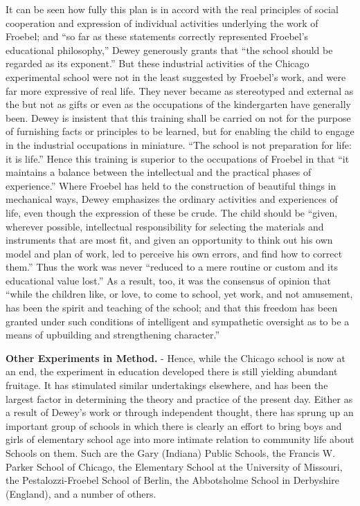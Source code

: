 \documentclass[
]{book}
\begin{document}
It can be seen how fully this plan is in accord with the real principles of social cooperation and expression of individual activities underlying the work of Froebel; and ``so far as these statements correctly represented Froebel's educational philosophy,'' Dewey generously grants that ``the school should be regarded as its exponent.'' But these industrial activities of the Chicago experimental school were not in the least suggested by Froebel's work, and were far more expressive of real life. They never became as stereotyped and external as the but not as gifts or even as the occupations of the kindergarten have generally been. Dewey is insistent that this training shall be carried on not for the purpose of furnishing facts or principles to be learned, but for enabling the child to engage in the industrial occupations in miniature. ``The school is not preparation for life: it is life.'' Hence this training is superior to the occupations of Froebel in that ``it maintains a balance between the intellectual and the practical phases of experience.'' Where Froebel has held to the construction of beautiful things in mechanical ways, Dewey emphasizes the ordinary activities and experiences of life, even though the expression of these be crude. The child should be ``given, wherever possible, intellectual responsibility for selecting the materials and instruments that are most fit, and given an opportunity to think out his own model and plan of work, led to perceive his own errors, and find how to correct them.'' Thus the work was never ``reduced to a mere routine or custom and its educational value lost.'' As a result, too, it was the consensus of opinion that ``while the children like, or love, to come to school, yet work, and not amusement, has been the spirit and teaching of the school; and that this freedom has been granted under such conditions of intelligent and sympathetic oversight as to be a means of upbuilding and strengthening character.''

\textbf{Other Experiments in Method.} - Hence, while the Chicago school is now at an end, the experiment in education developed there is still yielding abundant fruitage. It has stimulated similar undertakings elsewhere, and has been the largest factor in determining the theory and practice of the present day. Either as a result of Dewey's work or through independent thought, there has sprung up an important group of schools in which there is clearly an effort to bring boys and girls of elementary school age into more intimate relation to community life about Schools on them. Such are the Gary (Indiana) Public Schools, the Francis W. Parker School of Chicago, the Elementary School at the University of Missouri, the Pestalozzi-Froebel School of Berlin, the Abbotsholme School in Derbyshire (England), and a number of others.
\end{document}
